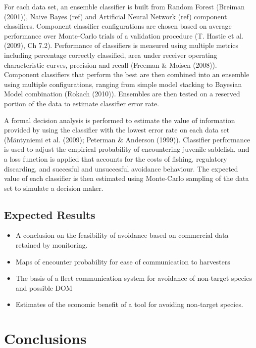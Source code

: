 \documentclass[12pt,]{scrartcl}
\providecommand{\tightlist}{%
  \setlength{\itemsep}{0pt}\setlength{\parskip}{0pt}}
\begin{document}
For each data set, an ensemble classifier is built from Random Forest
(Breiman (2001)), Naive Bayes (ref) and Artificial Neural Network (ref)
component classifiers. Component classifier configurations are chosen
based on average performance over Monte-Carlo trials of a validation
procedure (T. Hastie et al. (2009), Ch 7.2). Performance of classifiers
is measured using multiple metrics including percentage correctly
classified, area under receiver operating characteristic curves,
precision and recall (Freeman \& Moisen (2008)). Component classifiers
that perform the best are then combined into an ensemble using multiple
configurations, ranging from simple model stacking to Bayesian Model
combination (Rokach (2010)). Ensembles are then tested on a reserved
portion of the data to estimate classifier error rate.

A formal decision analysis is performed to estimate the value of
information provided by using the classifier with the lowest error rate
on each data set (Mäntyniemi et al. (2009); Peterman \& Anderson
(1999)). Classifier performance is used to adjust the empirical
probability of encountering juvenile sablefish, and a loss function is
applied that accounts for the costs of fishing, regulatory discarding,
and succesful and unsuccesful avoidance behaviour. The expected value of
each classifier is then estimated using Monte-Carlo sampling of the data
set to simulate a decision maker.

\subsection{Expected Results}\label{expected-results-3}

\begin{itemize}
\tightlist
\item
  A conclusion on the feasibility of avoidance based on commercial data
  retained by monitoring.
\item
  Maps of encounter probability for ease of communication to harvesters
\item
  The basis of a fleet communication system for avoidance of non-target
  species and possible DOM
\item
  Estimates of the economic benefit of a tool for avoiding non-target
  species.
\end{itemize}

\section{Conclusions}\label{conclusions}
\end{document}
